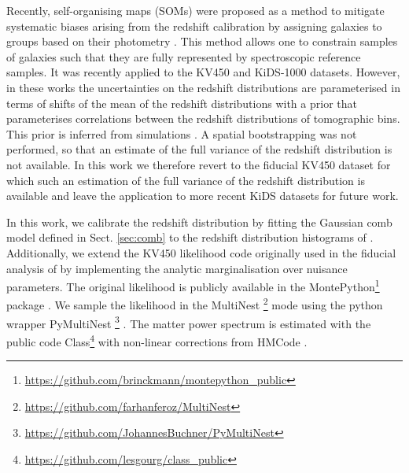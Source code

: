 \documentclass{aa}
\begin{document}
Recently, self-organising maps (SOMs) were proposed as a method to mitigate systematic biases arising from the redshift calibration by assigning galaxies to groups based on their photometry \citep{buchs, wright_som}. This method allows one to constrain samples of galaxies such that they are fully represented by spectroscopic reference samples. It was recently applied to the KV450 \citep{wright_som_kv450} and KiDS-1000 \citep{hildebrandt20, asgari20} datasets. However, in these works the uncertainties on the redshift distributions are parameterised in terms of shifts of the mean of the redshift distributions with a prior that parameterises correlations between the redshift distributions of tomographic bins. This prior is inferred from simulations \citep{wright_som, hildebrandt20, vdBusch20}. A spatial bootstrapping was not performed, so that an estimate of the full variance of the redshift distribution is not available. In this work we therefore revert to the fiducial KV450 dataset for which such an estimation of the full variance of the redshift distribution is available and leave the application to more recent KiDS datasets for future work.

In this work, we calibrate the redshift distribution by fitting the Gaussian comb model defined in Sect. \ref{sec:comb} to the redshift distribution histograms of \cite{hildebrandt18}. Additionally, we extend the KV450 likelihood code originally used in the fiducial analysis of \cite{hildebrandt18} by implementing the analytic marginalisation over nuisance parameters. The original likelihood is publicly available in the {\sc MontePython}\footnote{\url{https://github.com/brinckmann/montepython_public}} package \citep{Audren:2012wb, Brinckmann:2018cvx}. We sample the likelihood in the {\sc MultiNest} \footnote{\url{https://github.com/farhanferoz/MultiNest}} mode \citep{feroz09,feroz19} using the python wrapper {\sc PyMultiNest} \footnote{\url{https://github.com/JohannesBuchner/PyMultiNest}} \citep{buchner14}. The matter power spectrum is estimated with the public code {\sc Class}\footnote{\url{https://github.com/lesgourg/class_public}}\citep{blas11} with non-linear corrections from {\sc HMCode} \citep{mead15}. 
\end{document}
